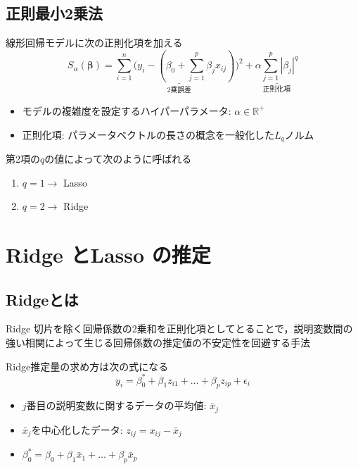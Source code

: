 \documentclass[dvipdfmx, 10pt]{beamer}
\begin{document}
\subsection{正則最小2乗法}
\begin{frame}{\insertsubsection}
    線形回帰モデルに次の正則化項を加える
    \begin{equation}
        S_{\alpha}(\bm{\beta}) = 
        \underset{\text{2乗誤差}}{\underline{
            \sum_{i=1}^{n}\bigl(
        		y_i - (
        			\beta_0 + \sum_{j=1}^{p} \beta_j {x}_{ij}
        		)
            \bigr)^2
        }}
    	 +  \underset{\text{正則化項}}{\underline{
            \alpha \sum_{j=1}^{p} |\beta_j|^q
        }}
    	\label{eq:extendLinearRegression}
    \end{equation}
    \begin{itemize}
        \item モデルの複雑度を設定するハイパーパラメータ: $\alpha \in \mathbb{R}^+$
        \item 正則化項: パラメータベクトルの長さの概念を一般化した$L_q$ノルム
     \end{itemize}
     \vspace{10pt}
    第2項の$q$の値によって次のように呼ばれる
    \begin{enumerate}
        \item $q=1 \rightarrow$ Lasso
        \item $q=2 \rightarrow$ Ridge
    \end{enumerate}
\end{frame}

\section{Ridge とLasso の推定}
\subsection{Ridgeとは}
\begin{frame}{\insertsubsection}
    \begin{block}{Ridge}
        切片を除く回帰係数の2乗和を正則化項としてとることで，説明変数間の強い相関によって生じる回帰係数の推定値の不安定性を回避する手法
    \end{block}
    \vspace{10pt}
    Ridge推定量の求め方は次の式になる
    \begin{equation}
        y_i = \beta_0^* + \beta_1 z_{i1} + \dots + \beta_p z_{ip} + \epsilon_i
	\label{eq:linear_model_centering}
    \end{equation}
    \begin{itemize}
    	\item $j$番目の説明変数に関するデータの平均値: $\bar{x}_j$
	\item  $\bar{x}_j$を中心化したデータ: $z_{ij}=x_{ij} - \bar{x}_j$
	\item $\beta_0^* = \beta_0 + \beta_1 \bar{x}_{1} + \dots + \beta_p \bar{x}_{p}$
    \end{itemize}
\end{frame}
\end{document}
